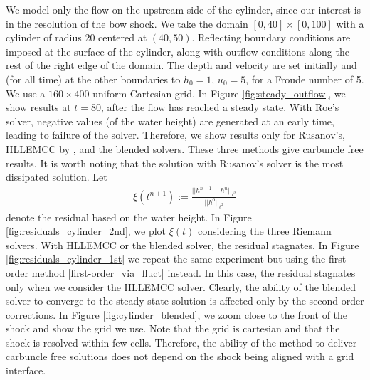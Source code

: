 \documentclass[preprint, 11pt]{article}
\begin{document}
We model only the flow on the upstream side of the cylinder, since
our interest is in the resolution of the bow shock.  We take the domain
$[0,40]\times[0,100]$ with a cylinder of radius 20 centered at $(40,50)$.
Reflecting boundary conditions are imposed at the surface of the cylinder,
along with outflow conditions along the rest of the right edge of the domain.
The depth and velocity are set initially and (for all time) at the other
boundaries to $h_0=1$, $u_0=5$, for a Froude number of 5.
We use a $160 \times 400$ uniform Cartesian grid.
%
In Figure \ref{fig:steady_outflow}, we show results at $t=80$, after the flow has reached
a steady state.  With Roe's solver, negative values (of the water height) are generated at an early
time, leading to failure of the solver.  Therefore, we show results only for
Rusanov's, HLLEMCC by \cite{kemm2014note}, and the blended solvers.
{\color{red}
  These three methods give carbuncle free results.
  It is worth noting that the solution with Rusanov's solver is the most dissipated solution. 
  Let 
  \begin{align}\label{res}
    \xi(t^{n+1}):=\frac{||h^{n+1}-h^n||_{\ell^2}}{||h^0||_{\ell^2}}
  \end{align}
  denote the residual based on the water height. In Figure \ref{fig:residuals_cylinder_2nd}, we plot $\xi(t)$ considering
  the three Riemann solvers. With HLLEMCC or the blended solver, the residual stagnates. 
  In Figure \ref{fig:residuals_cylinder_1st} we repeat the same experiment but using the first-order method \eqref{first-order_via_fluct} instead.
  In this case, the residual stagnates only when we consider the HLLEMCC solver.
  Clearly, the ability of the blended solver to converge to the steady state solution is affected only by the second-order corrections.
  In Figure \ref{fig:cylinder_blended}, we zoom close to the front of the shock and show the grid we use.
  Note that the grid is cartesian and that the shock is resolved within few cells. Therefore, the ability of the method to deliver
  carbuncle free solutions does not depend on the shock being aligned with a grid interface. 
}
\end{document}
